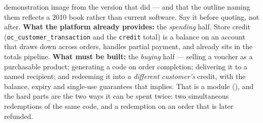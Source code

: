 \begin{ans}
        demonstration image from the version that did --- and that the outline
        naming them reflects a 2010 book rather than current software. Say it
        before quoting, not after. \textbf{What the platform already provides:}
        the \emph{spending} half. Store credit
        (\texttt{oc\_customer\_transaction} and the \texttt{credit} total) is a
        balance on an account that draws down across orders, handles partial
        payment, and already sits in the totals pipeline.
        \textbf{What must be built:} the \emph{buying} half --- selling a
        voucher as a purchasable product; generating a code on order
        completion; delivering it to a named recipient; and redeeming it into
        \emph{a different customer's} credit, with the balance, expiry and
        single-use guarantees that implies. That is a module
        (), and the hard parts are the two ways it can be spent
        twice: two simultaneous redemptions of the same code, and a redemption
        on an order that is later refunded.
\end{ans}

